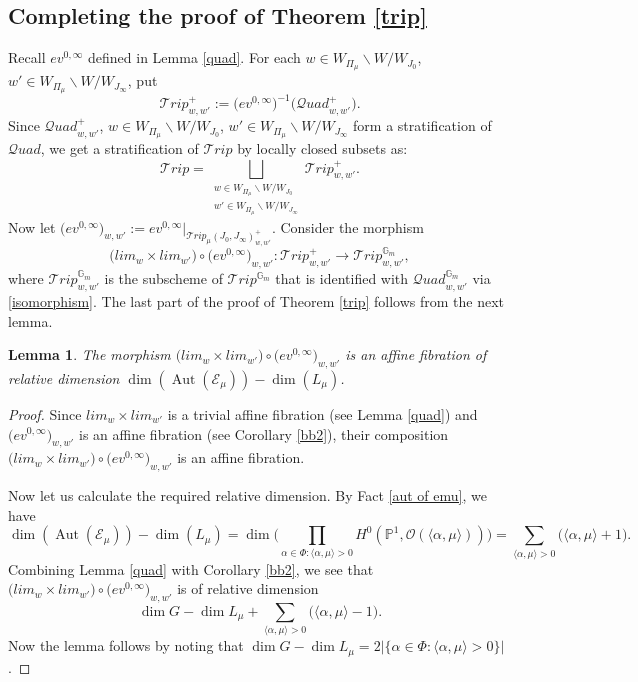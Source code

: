 \documentclass{amsart}
\newcommand{\cE}{\mathcal{E}}
\newcommand{\cQuad}{\mathcal{Q}uad}
\newcommand{\gm}{\mathbb{G}_{m}}
\newcommand{\clz}{lim_{w}}
\newcommand{\cli}{lim_{w'}}
\theoremstyle{plain}
\newtheorem{lemma}[theorem]{Lemma}
\newtheorem{fact}{Fact}[section]
\theoremstyle{definition}
\theoremstyle{remark}
\DeclareMathOperator{\aut}{Aut}
\begin{document}
\subsection{Completing the proof of Theorem \ref{trip}}
Recall $ev^{0,\infty}$ defined in Lemma \ref{quad}. For each $w\in W_{\Pi_{\mu}}\backslash W/W_{J_{0}}$, $w'\in W_{\Pi_{\mu}}\backslash W/W_{J_{\infty}}$, put
\[
\mathcal{T}rip_{w,w'}^{+}:=\big(ev^{0,\infty}\big)^{-1}\big(\cQuad^{+}_{w,w'}\big).
\]
Since $\cQuad^{+}_{w,w'}$, $w\in W_{\Pi_{\mu}}\backslash W/W_{J_{0}}$, $w'\in W_{\Pi_{\mu}}\backslash W/W_{J_{\infty}}$ form a stratification of $\cQuad$, we get a stratification of $\mathcal{T}rip$ by locally closed subsets as:
\[
\mathcal{T}rip=\displaystyle\bigsqcup_{\substack{w\in W_{\Pi_{\mu}}\backslash W/W_{J_{0}}
\\
w'\in W_{\Pi_{\mu}}\backslash W/W_{J_{\infty}}}}\mathcal{T}rip_{w,w'}^{+}.
\]
Now let $\big(ev^{0,\infty}\big)_{w,w'}:=ev^{0,\infty}|_{\mathcal{T}rip_{\mu}(J_{0},J_{\infty})_{w,w'}^{+}}$. Consider the morphism
\[
\big(\clz\times\cli\big)\circ\big(ev^{0,\infty}\big)_{w,w'}:\mathcal{T}rip_{w,w'}^{+}\rightarrow
\mathcal{T}rip_{w,w'}^{\gm},
\]
where $\mathcal{T}rip_{w,w'}^{\gm}$ is the subscheme of $\mathcal{T}rip^{\gm}$ that is identified with $\cQuad_{w,w'}^{\gm}$ via \eqref{isomorphism}. The last part of the proof of Theorem \ref{trip} follows from the next lemma.
\begin{lemma}\label{fiber}
The morphism $\big(\clz\times\cli\big)\circ\big(ev^{0,\infty}\big)_{w,w'}$ is an affine fibration of relative dimension $\dim(\aut(\cE_{\mu}))-\dim(L_{\mu})$.
\end{lemma}
\begin{proof}
Since $\clz\times\cli$ is a trivial affine fibration (see Lemma \ref{quad}) and $\big(ev^{0,\infty}\big)_{w,w'}$ is an affine fibration (see Corollary \ref{bb2}), their composition $\big(\clz\times\cli\big)\circ\big(ev^{0,\infty}\big)_{w,w'}$ is an affine fibration.

Now let us calculate the required relative dimension. By Fact \ref{aut of emu}, we have
\[
\dim(\aut(\cE_{\mu}))-\dim(L_{\mu})
=
\dim\Big(\prod_{\alpha\in\Phi:\langle\alpha,\mu\rangle>0}H^{0}(\mathbb{P}^{1},\mathcal{O}(\langle\alpha,\mu\rangle))\Big)
=
\sum_{\langle\alpha,\mu\rangle>0}\Big(\langle\alpha,\mu\rangle+1\Big).
\]
Combining Lemma \ref{quad} with Corollary \ref{bb2}, we see that $\big(\clz\times\cli\big)\circ\big(ev^{0,\infty}\big)_{w,w'}$ is of relative dimension 
\[
    \dim G-\dim L_\mu+\sum_{\langle\alpha,\mu\rangle>0}\Big(\langle\alpha,\mu\rangle-1\Big).
\]
Now the lemma follows by noting that $\dim G-\dim L_\mu=2|\{\alpha\in\Phi:\langle\alpha,\mu\rangle>0\}|$.
\end{proof}
\end{document}
